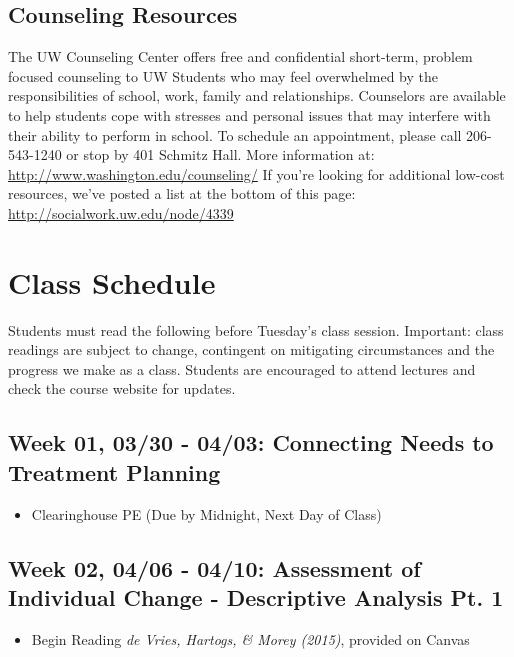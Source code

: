 \documentclass[11pt,]{article}
\providecommand{\tightlist}{%
  \setlength{\itemsep}{0pt}\setlength{\parskip}{0pt}}
\begin{document}
\subsection{Counseling Resources}\label{counseling-resources}

The UW Counseling Center offers free and confidential short-term,
problem focused counseling to UW Students who may feel overwhelmed by
the responsibilities of school, work, family and relationships.
Counselors are available to help students cope with stresses and
personal issues that may interfere with their ability to perform in
school. To schedule an appointment, please call 206-543-1240 or stop by
401 Schmitz Hall. More information at:
\url{http://www.washington.edu/counseling/} If you're looking for
additional low-cost resources, we've posted a list at the bottom of this
page: \url{http://socialwork.uw.edu/node/4339}

\newpage

\section{Class Schedule}\label{class-schedule}

Students must read the following before Tuesday's class session.
Important: class readings are subject to change, contingent on
mitigating circumstances and the progress we make as a class. Students
are encouraged to attend lectures and check the course website for
updates.

\subsection{Week 01, 03/30 - 04/03: Connecting Needs to Treatment
Planning}\label{week-01-0330---0403-connecting-needs-to-treatment-planning}

\begin{itemize}
\tightlist
\item
  Clearinghouse PE (Due by Midnight, Next Day of Class)
\end{itemize}

\subsection{Week 02, 04/06 - 04/10: Assessment of Individual Change -
Descriptive Analysis Pt.
1}\label{week-02-0406---0410-assessment-of-individual-change---descriptive-analysis-pt.-1}

\begin{itemize}
\tightlist
\item
  Begin Reading \emph{de Vries, Hartogs, \& Morey (2015)}, provided on
  Canvas
\end{itemize}
\end{document}
